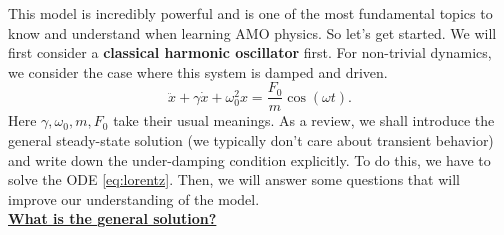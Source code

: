 \documentclass{book}
\theoremstyle{definition}
\newcommand{\f}[2]{\frac{#1}{#2}}
\begin{document}
This model is incredibly powerful and is one of the most fundamental topics to know and understand when learning AMO physics. So let's get started. We will first consider a \textbf{classical harmonic oscillator} first. For non-trivial dynamics, we consider the case where this system is damped and driven. 
\begin{equation}\label{eq:lorentz}
\ddot x + \gamma \dot x + \omega_0^2 x = \f{F_0}{m}\cos(\omega t).
\end{equation}
Here $\gamma,\omega_0,m,F_0$ take their usual meanings. As a review, we shall introduce the general steady-state solution (we typically don't care about transient behavior) and write down the under-damping condition explicitly. To do this, we have to solve the ODE  \eqref{eq:lorentz}. Then, we will answer some questions that will improve our understanding of the model. \\



\noindent \textbf{\underline{What is the general solution?}}  \\
\end{document}
